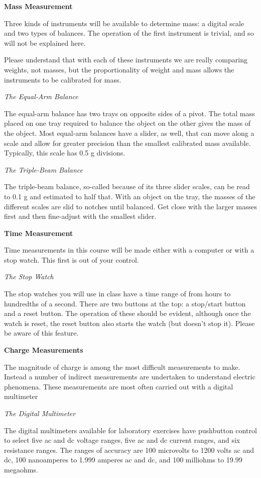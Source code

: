\textbf{Mass Measurement}

Three kinds of instruments will be available to determine mass: a digital scale and two types of balances. The operation of the first instrument is trivial, and so will not be explained here.

Please understand that with each of these instruments we are really comparing weights, not masses, but the proportionality of weight and mass allows the instruments to be calibrated for mass.

\textit{The Equal-Arm Balance}

The equal-arm balance has two trays on opposite sides of a pivot. The total mass placed on one tray required to balance the object on the other gives the mass of the object. Most equal-arm balances have a slider, as well, that can move along a scale and allow for greater precision than the smallest calibrated mass available. Typically, this scale has 0.5 g divisions.

\textit{The Triple-Beam Balance}

The triple-beam balance, so-called because of its three slider scales, can be read to 0.1 g and estimated to half that. With an object on the tray, the masses of the different scales are slid to notches until balanced. Get close with the larger masses first and then fine-adjust with the smallest slider.

\textbf{Time Measurement}

Time measurements in this course will be made either with a computer or with a stop watch. This first is out of your control.

\textit{The Stop Watch}

The stop watches you will use in class have a time range of from hours to hundredths of a second. There are two buttons at the top: a stop/start button and a reset button. The operation of these should be evident, although once the watch is reset, the reset button also starts the watch (but doesn't stop it). Please be aware of this feature.

\textbf{Charge Measurements}

The magnitude of charge is among the most difficult measurements to make. Instead a number of indirect measurements are undertaken to understand electric phenomena. These measurements are most often carried out with a digital multimeter

\textit{The Digital Multimeter}

The digital multimeters available for laboratory exercises have pushbutton control to select five ac and dc voltage ranges, five ac and dc current ranges, and six resistance ranges. The ranges of accuracy are 100 microvolts to 1200 volts ac and dc, 100 nanoamperes to 1.999 amperes ac and dc, and 100 milliohms to 19.99 megaohms.

